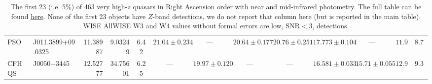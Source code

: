 \begin{table}
\begin{tabular}{llrrc cccc cccc}
PSO & J011.3899+09.0325 &   11.38987 &    9.03249 &  6.42   &   $21.04\pm0.234$  &  ---  &  $20.64\pm0.177$   & $20.76\pm0.251$    &   $17.773\pm0.104$   &  ---   &   $11.98$   &   $ 8.78$   \\
CFHQS & J0050+3445 &   12.52777 &   34.75601 &  6.25   &   ---  &  $19.97\pm0.120$  &  ---   & ---    &   $16.581\pm0.033$   &  $15.71\pm0.055$   &   $12.93$   &   $ 9.30$   \\
    \hline
    \hline
    \end{tabular}
    \caption{The first 23 (i.e. 5\%) of 463 very high-$z$ quasars in Right Ascension order with near and mid-infrared photometry. 
                  The full table can be found \href{https://github.com/d80b2t/VHzQ/tree/master/data}{here}. 
                  None of the first 23 objects have $Z$-band detections, we do not report that column here 
                  (but is reported in the main table). 
                  WISE AllWISE W3 and W4 values without formal errors are low, SNR$<3$, detections.
                } 
     \label{tab:output_table}
     \end{table}
     
